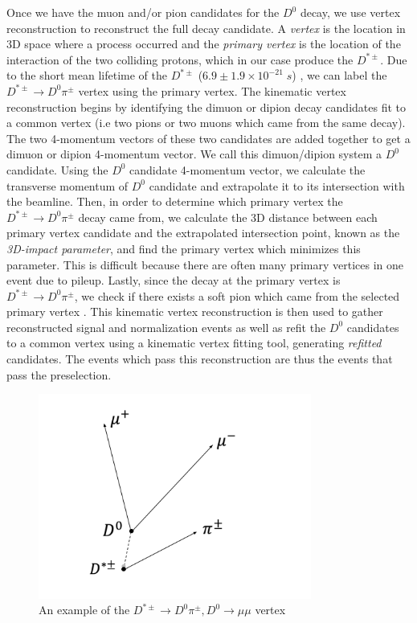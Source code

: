 Once we have the muon and/or pion candidates for the $D^0$ decay, we use vertex reconstruction to reconstruct the full decay candidate. A \textit{vertex} is the location in 3D space where a process occurred and the \textit{primary vertex} is the location of the interaction of the two colliding protons, which in our case produce the $D^{*\pm}$. Due to the short mean lifetime of the $D^{*\pm}$ ($ 6.9 \pm 1.9 \times 10^{-21} \; s$) \cite{ref:pdg2024}, we can label the $D^{*\pm} \to D^0 \pi^\pm$ vertex using the primary vertex. The kinematic vertex reconstruction begins by identifying the dimuon or dipion decay candidates fit to a common vertex (i.e two pions or two muons which came from the same decay). The two 4-momentum vectors of these two candidates are added together to get a dimuon or dipion 4-momentum vector. We call this dimuon/dipion system a $D^0$ candidate. Using the $D^0$ candidate 4-momentum vector, we calculate the transverse momentum of $D^0$ candidate and extrapolate it to its intersection with the beamline. Then, in order to determine which primary vertex the $D^{*\pm} \to D^0 \pi^\pm$ decay came from, we calculate the 3D distance between each primary vertex candidate and the extrapolated intersection point, known as the \textit{3D-impact parameter}, and find the primary vertex which minimizes this parameter. This is difficult because there are often many primary vertices in one event due to pileup. Lastly, since the decay at the primary vertex is $D^{*\pm} \to D^0 \pi^\pm$, we check if there exists a soft pion which came from the selected primary vertex \cite{ref:Prokofiev_Speer_2005}. This kinematic vertex reconstruction is then used to gather reconstructed signal and normalization events as well as refit the $D^0$ candidates to a common vertex using a kinematic vertex fitting tool, generating \textit{refitted} candidates. The events which pass this reconstruction are thus the events that pass the preselection. 

\begin{figure}[htbp]
    \centering
    \includegraphics[width=0.8\textwidth]{figures/chapter4/vertex_reconstruction.png}
    \caption{An example of the $D^{*\pm} \to D^0 \pi^\pm, D^0 \to \mu \mu$ vertex}
    \label{fig:vertex_reconstruction}
\end{figure}

